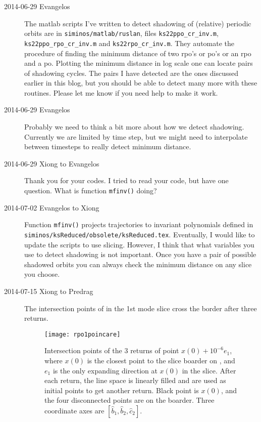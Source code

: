 \begin{description}
\item[2014-06-29 Evangelos] The matlab scripts I've written to
detect shadowing of (relative) periodic orbits are in
\texttt{siminos/matlab/ruslan}, files  \texttt{ks22ppo\_cr\_inv.m},
\texttt{ ks22ppo\_rpo\_cr\_inv.m} and \texttt{ks22rpo\_cr\_inv.m}.
They automate the procedure of finding the minimum distance of two
rpo's or po's or an rpo and a po. Plotting the minimum distance in
log scale one can locate pairs of shadowing cycles.
The pairs I have detected are the
ones discussed earlier in this blog, but you should be able to
detect many more with these routines.  Please let me know if
you need help to make it work.

\item[2014-06-29 Evangelos] Probably we need to think a bit more
about how we detect shadowing. Currently we are limited by
time step, but we might need to interpolate between timesteps to
really detect minimum distance.

\item[2014-06-29 Xiong to Evangelos] Thank you for your codes.
I tried to read your code, but have one question. What is function
\texttt{mfinv()} doing?

\item[2014-07-02 Evangelos to Xiong] Function \texttt{mfinv()}
projects trajectories to invariant polynomials defined in
\texttt{siminos/ksReduced/obsolete/ksReduced.tex}. Eventually,
I would like to update the scripts to use slicing. However,
I think that what variables you use to detect shadowing is not
important. Once you have a pair of possible shadowed orbits you
can always check the minimum distance on any slice you choose.

\item[2014-07-15 Xiong to Predrag]
The {\Poincare} intersection points of  in the 1st mode
slice cross the border after three returns.

\begin{figure}[h]
  \centering
  \texttt{[image: rpo1poincare]}
  \caption{
    Intersection points of the 3 returns of point $x(0)+10^{-6}e_1$,
    where $x(0)$ is the closest point to the slice boarder on
    , and $e_1$ is the only expanding direction at $x(0)$
    in the slice. After each return, the line space is linearly filled and
    are used as initial points to get another return. Black point is
    $x(0)$, and the four disconnected points are on the {\PoincSec}
    boarder. Three coordinate axes are $[\hat{b}_1, \hat{b}_2, \hat{c}_2]$.
  }
  \label{fig:rpo1poincare}
\end{figure}



\end{description}
